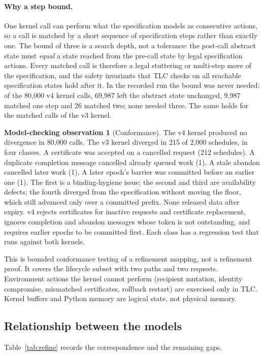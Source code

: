\documentclass[pdflatex,sn-mathphys-num,twocolumn]{sn-jnl}
\theoremstyle{plain}
\theoremstyle{definition}
\newtheorem{observation}{Model-checking observation}
\begin{document}
\paragraph{Why a step bound.}
One kernel call can perform what the specification models as consecutive actions, so a call is matched by a short sequence of specification steps rather than exactly one. The bound of three is a search depth, not a tolerance: the post-call abstract state must \emph{equal} a state reached from the pre-call state by legal specification actions. Every matched call is therefore a legal stuttering or multi-step move of the specification, and the safety invariants that TLC checks on all reachable specification states hold after it. In the recorded run the bound was never needed: of the 80,000 v4 kernel calls, 69,987 left the abstract state unchanged, 9,987 matched one step and 26 matched two; none needed three. The same holds for the matched calls of the v3 kernel.

\begin{observation}[Conformance]\label{obs:conformance}
The v4 kernel produced no divergence in 80,000 calls. The v3 kernel diverged in 215 of 2,000 schedules, in four classes. A certificate was accepted on a cancelled request (212 schedules). A duplicate completion message cancelled already queued work (1). A stale abandon cancelled later work (1). A later epoch's barrier was committed before an earlier one (1). The first is a binding-hygiene issue; the second and third are availability defects; the fourth diverged from the specification without moving the floor, which still advanced only over a committed prefix. None released data after expiry. v4 rejects certificates for inactive requests and certificate replacement, ignores completion and abandon messages whose token is not outstanding, and requires earlier epochs to be committed first. Each class has a regression test that runs against both kernels.
\end{observation}

This is bounded conformance testing of a refinement mapping, not a refinement proof. It covers the lifecycle subset with two paths and two requests. Environment actions the kernel cannot perform (recipient mutation, identity compromise, mismatched certificates, rollback restart) are exercised only in TLC. Kernel buffers and Python memory are logical state, not physical memory.

\subsection{Relationship between the models}
Table~\ref{tab:refine} records the correspondence and the remaining gaps.
\end{document}
